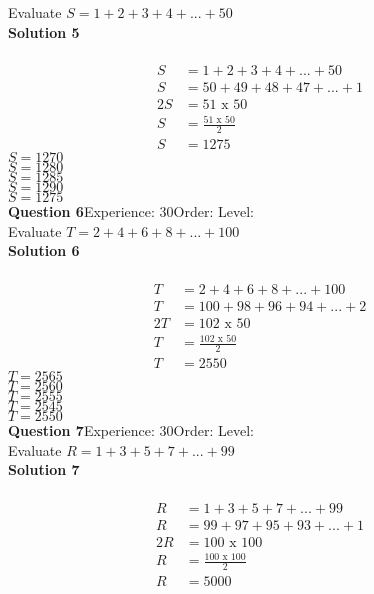 \documentclass{article}
\begin{document}
Evaluate $S=1+2+3+4+...+50$\\[4pt]
\noindent\textbf{Solution 5}\\[2pt]
\\[-10pt]\begin{align*}
S&=1+2+3+4+...+50\\[2pt]
S&=50+49+48+47+...+1\\[2pt]
2S&=51\,\,\text{x}\,\,50\\[2pt]
S&=\displaystyle\frac{51\,\,\text{x}\,\,50}{2}\\[2pt]
S&=1275
\end{align*}
$S=1270$\\
$S=1280$\\
$S=1285$\\
$S=1290$\\
$S=1275$\\
\noindent\textbf{Question 6}\hspace{20pt}Experience: 30\hspace{20pt}Order: \hspace{20pt}Level: \\[2pt]
Evaluate $T=2+4+6+8+...+100$\\[4pt]
\noindent\textbf{Solution 6}\\[2pt]
\\[-10pt]\begin{align*}
T&=2+4+6+8+...+100\\[2pt]
T&=100+98+96+94+...+2\\[2pt]
2T&=102\,\,\text{x}\,\,50\\[2pt]
T&=\displaystyle\frac{102\,\,\text{x}\,\,50}{2}\\[2pt]
T&=2550
\end{align*}
$T=2565$\\
$T=2560$\\
$T=2555$\\
$T=2545$\\
$T=2550$\\
\noindent\textbf{Question 7}\hspace{20pt}Experience: 30\hspace{20pt}Order: \hspace{20pt}Level: \\[2pt]
Evaluate $R=1+3+5+7+...+99$\\[4pt]
\noindent\textbf{Solution 7}\\[2pt]
\\[-10pt]\begin{align*}
R&=1+3+5+7+...+99\\[2pt]
R&=99+97+95+93+...+1\\[2pt]
2R&=100\,\,\text{x}\,\,100\\[2pt]
R&=\displaystyle\frac{100\,\,\text{x}\,\,100}{2}\\[2pt]
R&=5000
\end{align*}
\end{document}

